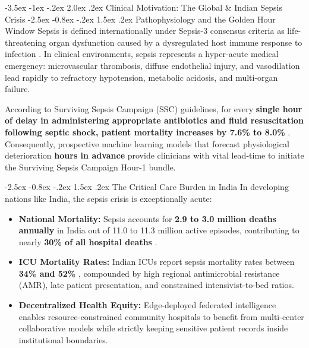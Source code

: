 \documentclass[11pt, a4paper]{article}
\makeatletter
\renewcommand\section{\@startsection {section}{1}{\z@}%
                                   {-3.5ex \@plus -1ex \@minus -.2ex}%
                                   {2.0ex \@plus.2ex}%
                                   {\normalfont\large\bfseries\color{amritaMaroon}}}
\renewcommand\subsection{\@startsection {subsection}{2}{\z@}%
                                   {-2.5ex \@plus -0.8ex \@minus -.2ex}%
                                   {1.5ex \@plus.2ex}%
                                   {\normalfont\normalsize\bfseries\color{slateNavy}}}
\makeatother
\begin{document}
\section{Clinical Motivation: The Global \& Indian Sepsis Crisis}
\subsection{Pathophysiology and the Golden Hour Window}
Sepsis is defined internationally under Sepsis-3 consensus criteria as life-threatening organ dysfunction caused by a dysregulated host immune response to infection \cite{singer2016sepsis3}. In clinical environments, sepsis represents a hyper-acute medical emergency: microvascular thrombosis, diffuse endothelial injury, and vasodilation lead rapidly to refractory hypotension, metabolic acidosis, and multi-organ failure. 

According to Surviving Sepsis Campaign (SSC) guidelines, for every \textbf{single hour of delay in administering appropriate antibiotics and fluid resuscitation following septic shock, patient mortality increases by 7.6\% to 8.0\%} \cite{evans2021surviving}. Consequently, prospective machine learning models that forecast physiological deterioration \textbf{hours in advance} provide clinicians with vital lead-time to initiate the Surviving Sepsis Campaign Hour-1 bundle.

\subsection{The Critical Care Burden in India}
In developing nations like India, the sepsis crisis is exceptionally acute:
\begin{itemize}
    \item \textbf{National Mortality:} Sepsis accounts for \textbf{2.9 to 3.0 million deaths annually} in India out of 11.0 to 11.3 million active episodes, contributing to nearly \textbf{30\% of all hospital deaths} \cite{kalakoti2025fedxai}.
    \item \textbf{ICU Mortality Rates:} Indian ICUs report sepsis mortality rates between \textbf{34\% and 52\%} \cite{dusing2025sepsis}, compounded by high regional antimicrobial resistance (AMR), late patient presentation, and constrained intensivist-to-bed ratios.
    \item \textbf{Decentralized Health Equity:} Edge-deployed federated intelligence enables resource-constrained community hospitals to benefit from multi-center collaborative models while strictly keeping sensitive patient records inside institutional boundaries.
\end{itemize}
\end{document}

